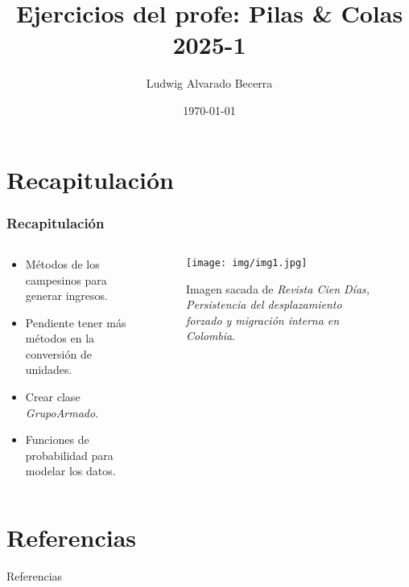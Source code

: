 \documentclass[17pt, t, lualatex]{beamer}
\title{\LARGE Ejercicios del profe: Pilas \& Colas 2025-1}
\date{\today}
\institute[UJTL]{Universidad Jorge Tadeo Lozano - Semillero de Programación Competitiva}
\author{Ludwig Alvarado Becerra}
\begin{document}
\inserttitlepage

\section{Recapitulación}

\insertsectionpage


\begin{frame}
  \frametitle{Recapitulación} 

\begin{columns}
  \begin{column}{.5\textwidth}
    \begin{itemize}
      \item Métodos de los campesinos para generar ingresos.
      \item Pendiente tener más métodos en la conversión de unidades.
      \item Crear clase \textit{GrupoArmado}.
      \item Funciones de probabilidad para modelar los datos.
    \end{itemize}
  \end{column}

  \begin{column}{.5\textwidth}
    \begin{figure}[ht]
      \centering
      \texttt{[image: img/img1.jpg]}
      \caption{Imagen sacada de \textit{Revista Cien Días, Persistencia del desplazamiento forzado y migración interna en Colombia}\cite{Leal2022Desplazamiento}.}
    \end{figure}

  \end{column}
\end{columns}


\end{frame}




\section{Referencias}

\insertsectionpage
\begin{frame}[allowframebreaks]{Referencias}
  \printbibliography
\end{frame}


\insertendpage
\end{document}
